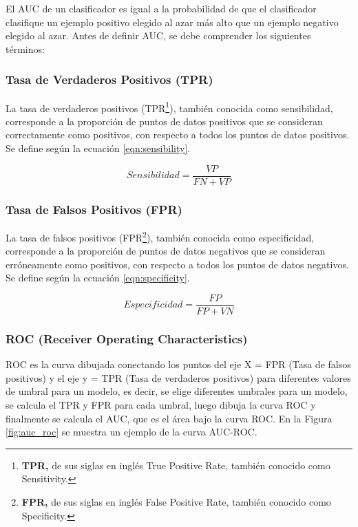 \vspace{5mm} %

El AUC de un clasificador es igual a la probabilidad de que el clasificador clasifique un ejemplo positivo elegido al azar m\'{a}s alto que un ejemplo negativo elegido al azar. Antes de definir AUC, se debe comprender los siguientes t\'{e}rminos:

\subsubsection{Tasa de Verdaderos Positivos (TPR)}

La tasa de verdaderos positivos (TPR\footnote{\textbf{TPR, }de sus siglas en ingl\'{e}s True Positive Rate, tambi\'{e}n conocido como Sensitivity.}), tambi\'{e}n conocida como sensibilidad, corresponde a la proporción de puntos de datos positivos que se consideran correctamente como positivos, con respecto a todos los puntos de datos positivos. Se define seg\'{u}n la ecuaci\'{o}n \ref{eqn:sensibility}.

\begin{equation}
Sensibilidad = \frac{VP}{FN+VP}
\label{eqn:sensibility}
\end{equation}

\subsubsection{Tasa de Falsos Positivos (FPR) }

La tasa de falsos positivos (FPR\footnote{\textbf{FPR, }de sus siglas en ingl\'{e}s False Positive Rate, tambi\'{e}n conocido como Specificity.}), tambi\'{e}n conocida como especificidad, corresponde a la proporción de puntos de datos negativos que se consideran erróneamente como positivos, con respecto a todos los puntos de datos negativos. Se define seg\'{u}n la ecuaci\'{o}n \ref{eqn:specificity}.

\begin{equation}
Especificidad = \frac{FP}{FP+VN}
\label{eqn:specificity}
\end{equation}

\subsubsection{ROC (Receiver Operating Characteristics)}

ROC es la curva dibujada conectando los puntos del eje X = FPR (Tasa de falsos positivos) y el eje y = TPR (Tasa de verdaderos positivos) para diferentes valores de umbral para un modelo, es decir, se elige diferentes umbrales para un modelo, se calcula el TPR y FPR para cada umbral, luego dibuja la curva ROC y finalmente se calcula el AUC, que es el \'{a}rea bajo la curva ROC. En la Figura \ref{fig:auc_roc} se muestra un ejemplo de la curva AUC-ROC.

